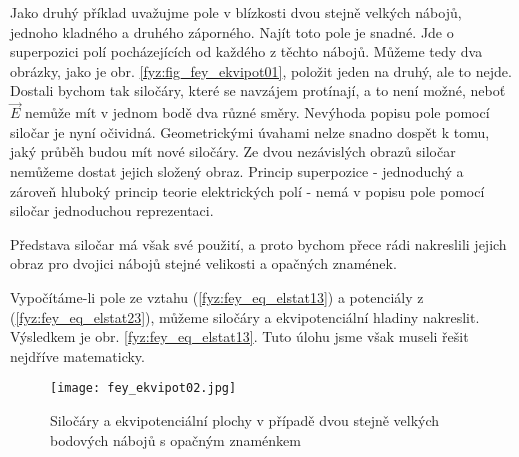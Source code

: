     Jako druhý příklad uvažujme pole v blízkosti dvou stejně velkých nábojů, jednoho kladného a 
    druhého záporného. Najít toto pole je snadné. Jde o superpozici polí pocházejících od každého z 
    těchto nábojů. Můžeme tedy dva obrázky, jako je obr. \ref{fyz:fig_fey_ekvipot01}, položit jeden 
    na druhý, ale to nejde. Dostali bychom tak siločáry, které se navzájem protínají, a to není 
    možné, neboť \(\vec{E}\) nemůže mít v jednom bodě dva různé směry. Nevýhoda popisu pole pomocí 
    siločar je nyní očividná. Geometrickými úvahami nelze snadno dospět k tomu, jaký průběh budou 
    mít nové siločáry. Ze dvou nezávislých obrazů siločar nemůžeme dostat jejich složený obraz. 
    Princip superpozice - jednoduchý a zároveň hluboký princip teorie elektrických polí - nemá v 
    popisu pole pomocí siločar jednoduchou reprezentaci.
    
    Představa siločar má však své použití, a proto bychom přece rádi nakreslili jejich obraz pro 
    dvojici nábojů stejné velikosti a opačných znamének.
    
    Vypočítáme-li pole ze vztahu (\ref{fyz:fey_eq_elstat13}) a potenciály z 
    (\ref{fyz:fey_eq_elstat23}), můžeme siločáry a ekvipotenciální hladiny nakreslit. Výsledkem je 
    obr. \ref{fyz:fey_eq_elstat13}. Tuto úlohu jsme však museli řešit nejdříve matematicky.
    \begin{figure}[ht!]
     \centering
     \texttt{[image: fey\_ekvipot02.jpg]}
     \caption[Siločáry a ekvipotenciální plochy]{Siločáry a ekvipotenciální plochy v případě dvou 
              stejně velkých bodových nábojů s opačným znaménkem}
     \label{fyz:fig_fey_ekvipot02}
    \end{figure}
        
\printbibliography[heading=subbibliography]
